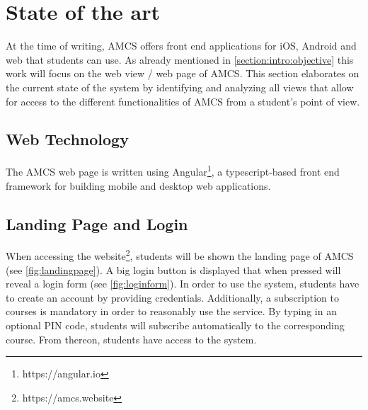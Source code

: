 \chapter{State of the art}
\label{chapter:stateoftheart}
At the time of writing, AMCS offers front end applications for iOS, Android and web that students can use. As already mentioned in \autoref{section:intro:objective} this work will focus on the web view / web page of AMCS.
This section elaborates on the current state of the system by identifying and analyzing all views that allow for access to the different functionalities of AMCS from a student's point of view. 

\section{Web Technology}
The AMCS web page is written using Angular\footnote{https://angular.io}, a typescript-based front end framework for building mobile and desktop web applications.

\section{Landing Page and Login}
\label{section:landingpage}
When accessing the website\footnote{https://amcs.website}, students will be shown the landing page of AMCS (see \autoref{fig:landingpage}). A big login button is displayed that when pressed will reveal a login form (see \autoref{fig:loginform}).
In order to use the system, students have to create an account by providing credentials.
\newline
\newline
Additionally, a subscription to courses is mandatory in order to reasonably use the service. By typing in an optional PIN code, students will subscribe automatically to the corresponding course. From thereon, students have access to the system. 
 
